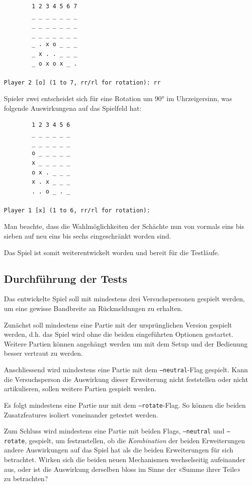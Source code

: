 \documentclass[a4paper,11pt,hidelinks]{scrartcl}
\begin{document}
\begin{lstlisting}
        1 2 3 4 5 6 7
        _ _ _ _ _ _ _
        _ _ _ _ _ _ _
        _ _ _ _ _ _ _
        _ . x o _ _ _
        _ x . . _ _ _
        _ o x o x _ .

Player 2 [o] (1 to 7, rr/rl for rotation): rr
\end{lstlisting}

Spieler zwei entscheidet sich für eine Rotation um 90° im Uhrzeigersinn, was folgende Auswirkungena auf das Spielfeld hat:

\begin{lstlisting}
        1 2 3 4 5 6
        _ _ _ _ _ _
        _ _ _ _ _ _
        o _ _ _ _ _
        x _ _ _ _ _
        o x . _ _ _
        x . x _ _ _
        . . o _ . _

Player 1 [x] (1 to 6, rr/rl for rotation):
\end{lstlisting}

Man beachte, dass die Wahlmöglichkeiten der Schächte nun von vormals eins bis sieben auf neu eins bis sechs eingeschränkt worden sind.

Das Spiel ist somit weiterentwickelt worden und bereit für die Testläufe.

\subsection{Durchführung der Tests}

Das entwickelte Spiel soll mit mindestens drei Versuchspersonen gespielt werden, um eine gewisse Bandbreite an Rückmeldungen zu erhalten.

Zunächst soll mindestens eine Partie mit der ursprünglichen Version gespielt werden, d.h. das Spiel wird ohne die beiden eingeführten Optionen gestartet. Weitere Partien können angehängt werden um mit dem Setup und der Bedienung besser vertraut zu werden.

Anschliessend wird mindestens eine Partie mit dem \texttt{--neutral}-Flag gespielt. Kann die Versuchsperson die Auswirkung dieser Erweiterung nicht feststellen oder nicht artikulieren, sollen weitere Partien gespielt werden.

Es folgt mindestens eine Partie nur mit dem \texttt{--rotate}-Flag. So können die beiden Zusatzfeatures isoliert voneinander getestet werden.

Zum Schluss wird mindestens eine Partie mit beiden Flags, \texttt{--neutral} und \texttt{--rotate}, gespielt, um festzustellen, ob die \textit{Kombination} der beiden Erweiterungen andere Auswirkungen auf das Spiel hat als die beiden Erweiterungen für sich betrachtet. Wirken sich die beiden neuen Mechanismen wechselseitig aufeinander aus, oder ist die Auswirkung derselben bloss im Sinne der «Summe ihrer Teile» zu betrachten?
\end{document}
